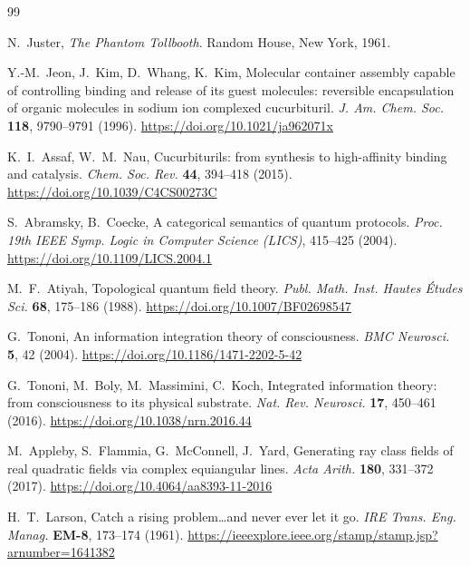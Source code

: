 \documentclass[12pt,a4paper]{article}
\makeatletter
\renewcommand{\_}{\ig@origunderscore\discretionary{}{}{}}
\makeatother
\begin{document}
\begin{thebibliography}{99}

N.~Juster, \emph{The Phantom Tollbooth}. Random House, New York, 1961.

Y.-M.~Jeon, J.~Kim, D.~Whang, K.~Kim,
Molecular container assembly capable of controlling binding and release of its
guest molecules: reversible encapsulation of organic molecules in sodium ion
complexed cucurbituril.
\emph{J. Am. Chem. Soc.} \textbf{118}, 9790--9791 (1996).
\url{https://doi.org/10.1021/ja962071x}

K.~I.~Assaf, W.~M.~Nau,
Cucurbiturils: from synthesis to high-affinity binding and catalysis.
\emph{Chem. Soc. Rev.} \textbf{44}, 394--418 (2015).
\url{https://doi.org/10.1039/C4CS00273C}

S.~Abramsky, B.~Coecke,
A categorical semantics of quantum protocols.
\emph{Proc. 19th IEEE Symp. Logic in Computer Science (LICS)}, 415--425 (2004).
\url{https://doi.org/10.1109/LICS.2004.1}

M.~F.~Atiyah,
Topological quantum field theory.
\emph{Publ. Math. Inst. Hautes \'Etudes Sci.} \textbf{68}, 175--186 (1988).
\url{https://doi.org/10.1007/BF02698547}

G.~Tononi,
An information integration theory of consciousness.
\emph{BMC Neurosci.} \textbf{5}, 42 (2004).
\url{https://doi.org/10.1186/1471-2202-5-42}

G.~Tononi, M.~Boly, M.~Massimini, C.~Koch,
Integrated information theory: from consciousness to its physical substrate.
\emph{Nat. Rev. Neurosci.} \textbf{17}, 450--461 (2016).
\url{https://doi.org/10.1038/nrn.2016.44}

M.~Appleby, S.~Flammia, G.~McConnell, J.~Yard,
Generating ray class fields of real quadratic fields via complex equiangular lines.
\emph{Acta Arith.} \textbf{180}, 331--372 (2017).
\url{https://doi.org/10.4064/aa8393-11-2016}

H.~T.~Larson,
Catch a rising problem\ldots and never ever let it go.
\emph{IRE Trans. Eng. Manag.} \textbf{EM-8}, 173--174 (1961).
\url{https://ieeexplore.ieee.org/stamp/stamp.jsp?arnumber=1641382}

\end{thebibliography}
\end{document}
